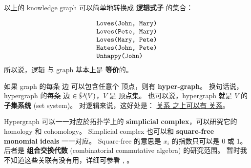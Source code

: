 \documentclass[12pt, orivec]{article}
\newcommand{\cc}[2]{#1}
\newcommand{\cc}[2]{#2}
\newcommand{\powerset}{\raisebox{.15\baselineskip}{\Large\ensuremath{\wp}}}
\begin{document}
\cc{以上的 knowledge graph 可以简单地转换成 \textbf{逻辑式子} 的集合：
}{
The above knowledge graph can be easily converted into a collection of \textbf{logic formulas}:}
\footnotesize
\begin{equation}
\begin{array}{l}
	\verb|Loves(John, Mary)| \\
	\verb|Loves(Pete, Mary)| \\
	\verb|Loves(Mary, Pete)| \\
	\verb|Hates(John, Pete)| \\
	\verb|Unhappy(John)|
\end{array}
\label{FOL-model}
\end{equation}
\normalsize
\cc{所以说，\uline{逻辑 与 graph 基本上是 }\textbf{\uline{等价}}\uline{的}。
}{
So, \uline{logic and graphs are basically }\textbf{\uline{equivalent}}.}

\begin{tcolorbox}[breakable, parbox=false, fonttitle=\bfseries, title=Hypergraphs and simplicial complexes]
\cc{如果 graph 的每条 边 可以包含任意个 顶点，则有 \textbf{hyper-graph}。 换句话说，hypergraph 的每条 边 $\in \powerset(V)$，$V$ 是 顶点集。 也可以说，hypergraph 就是 $V$ 的 \textbf{子集系统} (set system)。  对逻辑来说，这好处是： \uline{关系 之上可以有 关系}。  
}{
If an edge of a graph can contain any number of vertices, then we have a \textbf{hyper-graph}. In other words, each edge of the hypergraph $\in \powerset(V)$, $V$ is the vertex set.  It can also be said that the hypergraph is the \textbf{ subset system} of $V$.  For logic, the benefit is that \uline{there can be relations over relations}.}

\cc{Hypergraph 可以一一对应於拓扑学上的 \textbf{simplicial complex}，可以研究它的 homology 和 cohomology。 Simplicial complex 也可以和 \textbf{square-free monomial ideals} 一一对应。 Square-free 的意思是 $x_i$ 的指数只可以是 0 或 1。  后者是 \textbf{组合交换代数} (combinatorial commutative algebra) 的研究范围。  暂时我不知道这些关联有没有用，详细可参看 \parencite{Brown2013}, \parencite{Miller2005}。
}{
Hypergraph can 1-1 correspond to topological \textbf{simplicial complexes}, and its homology and cohomology can be studied.  Simplicial complexes can also 1-1 correspond to \textbf{square-free monomial ideals}.  Square-free means that the exponent of $x_i$ can only be 0 or 1.  The latter is the scope of \textbf{combinatorial commutative algebra}.  For the time being, I don't know if these associations are useful.  See \parencite{Brown2013}, \parencite{Miller2005} for details.}
\end{tcolorbox}
\end{document}
